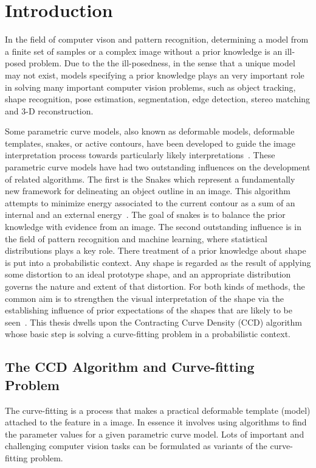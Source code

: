 \chapter{Introduction}
\label{chapter:Introduction}
In the field of computer vison and pattern recognition, determining a
model from a finite set of samples or a complex image without a prior
knowledge is an ill-posed problem. Due to the the ill-posedness, in
the sense that a unique model may not exist, models specifying a prior
knowledge plays an very important role in solving many important
computer vision problems, such as object tracking, shape recognition,
pose estimation, segmentation, edge detection, stereo matching and 3-D
reconstruction.

Some parametric curve models, also known as deformable models,
deformable templates, snakes, or active contours, have been developed
to guide the image interpretation process towards particularly
likely interpretations~\cite{hanek2004fitting}. These parametric curve
models have had two outstanding influences on the
development of related algorithms. The first is the Snakes which
represent a fundamentally new framework for delineating an object
outline in an image. This algorithm attempts to minimize energy
associated to the current contour as a sum of an internal and an external
energy~\cite{kass1988snakes}. The goal of snakes is to balance the prior
knowledge with evidence from an image. The second outstanding
influence is in the field of pattern recognition and machine learning,
where statistical distributions plays a key role.  There treatment
of a prior knowledge about shape is put into a probabilistic
context. Any shape is regarded as the result of applying some
distortion to an ideal prototype shape, and an appropriate
distribution governs the nature and extent of that distortion.
For both kinds of methods, the common aim is to strengthen the visual
interpretation of the shape via the establishing influence of prior
expectations of the shapes that are likely to be
seen~\cite{blake1998active}. This thesis dwells upon the Contracting
Curve Density (CCD) algorithm whose basic step is solving a
curve-fitting problem in a probabilistic context.


\section{The CCD Algorithm and Curve-fitting Problem}
\label{sec:ccdcfp}
The curve-fitting is a process that makes
a practical deformable template (model) attached to the feature in a
image. In essence it involves using algorithms to find the parameter
values for a given parametric curve model. Lots of important and
challenging computer vision tasks can be formulated as variants of the
curve-fitting problem. 

